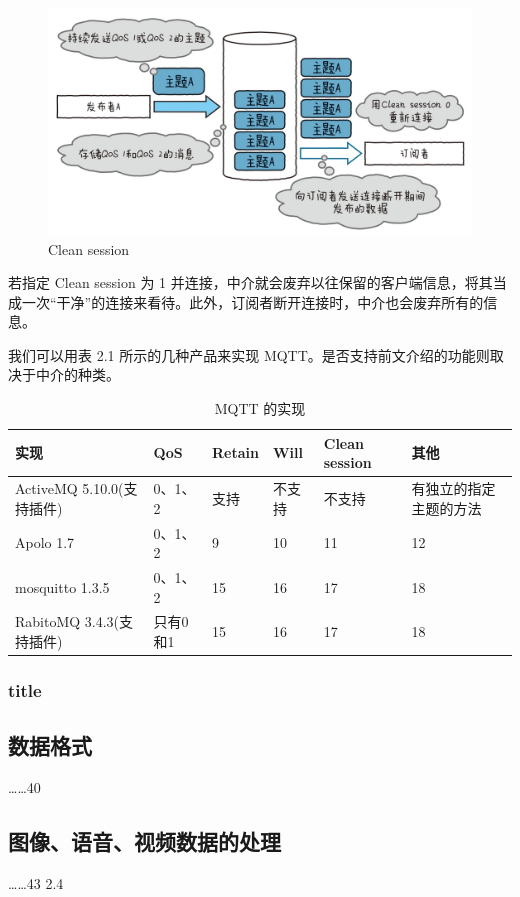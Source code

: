 \documentclass[12pt,UTF8]{ctexbook}
\begin{document}
\begin{figure}[htbp]
	\centering
	\includegraphics[width=1\linewidth]{35}
	\caption{Clean session}
	\label{fig:1}
\end{figure}

若指定 Clean session 为 1 并连接，中介就会废弃以往保留的客户端信息，将其当成一次“干净”的连接来看待。此外，订阅者断开连接时，中介也会废弃所有的信息。

我们可以用表 2.1 所示的几种产品来实现 MQTT。是否支持前文介绍的功能则取决于中介的种类。

\begin{table}[!ht] 
\centering
\caption{MQTT 的实现}
\begin{tabular}{|l|l|l|l|l|l|}
	\hline
	实现 & QoS & Retain & Will & Clean session & 其他 \\
	\hline
	ActiveMQ 5.10.0(支持插件) & 0、1、2 & 支持 & 不支持 & 不支持 & 有独立的指定主题的方法  \\
	\hline
	Apolo 1.7 &	0、1、2 &	9 &	10 & 11 & 12\\
	\hline
	mosquitto 1.3.5 & 0、1、2 & 15 & 16 &	17 & 18\\
	\hline
	RabitoMQ 3.4.3(支持插件) & 只有0和1 & 15 & 16 &	17 & 18\\
	\hline
\end{tabular}
\end{table}

\subsubsection{title}

\subsection{数据格式}……40
\subsection{图像、语音、视频数据的处理}……43
2.4
\end{document}
